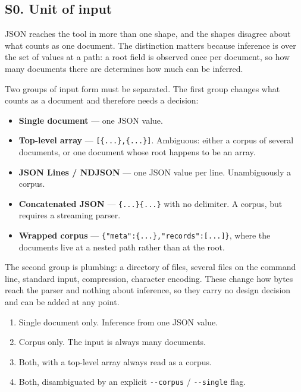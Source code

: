 \subsection*{S0. Unit of input}

JSON reaches the tool in more than one shape, and the shapes disagree about
what counts as one document. The distinction matters because inference is over
the set of values at a path: a root field is observed once per document, so
how many documents there are determines how much can be inferred.

Two groups of input form must be separated. The first group changes what
counts as a document and therefore needs a decision:

\begin{itemize}
  \item \textbf{Single document} --- one JSON value.
  \item \textbf{Top-level array} --- \texttt{[\{...\},\{...\}]}. Ambiguous:
        either a corpus of several documents, or one document whose root
        happens to be an array.
  \item \textbf{JSON Lines / NDJSON} --- one JSON value per line.
        Unambiguously a corpus.
  \item \textbf{Concatenated JSON} --- \texttt{\{...\}\{...\}} with no
        delimiter. A corpus, but requires a streaming parser.
  \item \textbf{Wrapped corpus} --- \texttt{\{"meta":\{...\},"records":[...]\}},
        where the documents live at a nested path rather than at the root.
\end{itemize}

The second group is plumbing: a directory of files, several files on the
command line, standard input, compression, character encoding. These change
how bytes reach the parser and nothing about inference, so they carry no
design decision and can be added at any point.

\options
\begin{enumerate}[label=\textbf{(\alph*)}]
  \item Single document only. Inference from one JSON value.
  \item Corpus only. The input is always many documents.
  \item Both, with a top-level array always read as a corpus. \selected
  \item Both, disambiguated by an explicit \texttt{-{}-corpus} /
        \texttt{-{}-single} flag.
\end{enumerate}

